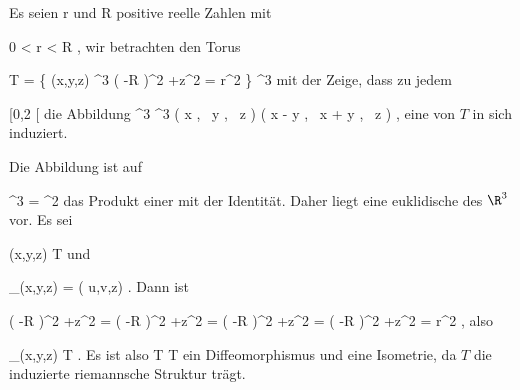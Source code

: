 {

Es seien
\mathkor {} {r} {und} {R} {}
positive reelle Zahlen mit

\mavergleichskette
{\vergleichskette
{ 0
}
{ < }{ r
}
{ < }{ R
}
{    }{
}
{   }{
}
}
{}{}{,}
wir betrachten den
 {} {}
Torus

\mavergleichskettedisp
{\vergleichskette
{ T
}
{ =} { \left\{ (x,y,z) \in \R^3  \mid   \left(   -R  \right)^2 +z^2  = r^2         \right\}
}
{ \subseteq} { \R^3
}
{ } {
}
{ } {
}
}
{}{}{}
mit der
Zeige, dass zu jedem

\mavergleichskette
{\vergleichskette
{ \alpha
}
{ \in }{ [0,2 \pi [
}
{  }{
}
{    }{
}
{   }{
}
}
{}{}{}
die Abbildung
\maabbeledisp {\Psi_\alpha} {\R^3} {\R^3
} { \left(  x   , \,   y  , \,  z                 \right) } { \left(  x \cos \alpha - y \sin  \alpha   , \,   x \sin \alpha + y \cos  \alpha  , \,  z                 \right)
} {,}
eine
von $T$ in sich induziert.

}
{

Die Abbildung ist auf

\mavergleichskettedisp
{\vergleichskette
{ \R^3
}
{ =} { \R^2 \times \R
}
{ } {
}
{ } {
}
{ } {
}
}
{}{}{}
das Produkt einer
mit der Identität. Daher liegt eine euklidische
des $\R^3$ vor. Es sei

\mavergleichskette
{\vergleichskette
{ (x,y,z)
}
{ \in }{  T
}
{  }{
}
{    }{
}
{   }{
}
}
{}{}{}
und

\mavergleichskettedisp
{\vergleichskette
{ \Psi_\alpha(x,y,z)
}
{ =} { ( u,v,z)
}
{ } {
}
{ } {
}
{ } {
}
}
{}{}{.}
Dann ist

\mavergleichskettealigndrucklinks
{\vergleichskettealigndrucklinks
{ \left(   -R  \right)^2 +z^2
}
{ =} { \left(   -R  \right)^2 +z^2
}
{ =} { \left(   -R  \right)^2 +z^2
}
{ =} { \left(   -R  \right)^2 +z^2
}
{ =} { r^2
}
}
{}{}{,}
also

\mavergleichskette
{\vergleichskette
{ \Psi_\alpha(x,y,z)
}
{ \in }{  T
}
{  }{
}
{    }{
}
{   }{
}
}
{}{}{.}
Es ist also
\maabbdisp {\Psi_\alpha} { T} {T
} {}
ein Diffeomorphismus und eine Isometrie, da $T$ die induzierte riemannsche Struktur trägt.

 }

